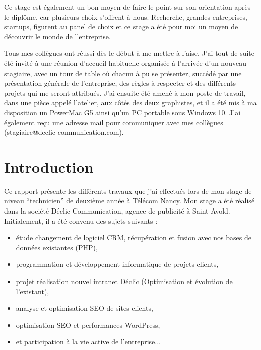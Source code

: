 \documentclass[report]{tnreport}
\begin{document}
Ce stage est également un bon moyen de faire le point sur son orientation après le diplôme, car plusieurs choix s’offrent à nous. Recherche, grandes entreprises, startups, figurent au panel de choix et ce stage a été pour moi un moyen de découvrir le monde de l’entreprise.

Tous mes collègues ont réussi dès le début à me mettre à l’aise. J'ai tout de suite été invité à une réunion d’accueil habituelle organisée à l’arrivée d’un nouveau stagiaire, avec un tour de table où chacun à pu se présenter, succédé par une présentation générale de l’entreprise, des règles à respecter et des différents projets qui me seront attribués. J’ai ensuite été amené à mon poste de travail, dans une pièce appelé l’atelier, aux côtés des deux graphistes, et il a été mis à ma disposition un PowerMac G5 ainsi qu’un PC portable sous Windows 10. J’ai également reçu une adresse mail pour communiquer avec mes collègues (stagiaire@declic-communication.com).





\cleardoublepage

\tableofcontents

\renewcommand{\baselinestretch}{1.0}\normalsize
\cleardoublepage

\setcounter{page}{1}

\chapter{Introduction}
Ce rapport présente les différents travaux que j’ai effectués lors de mon stage de niveau “technicien” de deuxième année à Télécom Nancy. Mon stage a été réalisé dans la société Déclic Communication, agence de publicité à Saint-Avold. Initialement, il a été convenu des sujets suivants :


\begin{itemize}
\item étude changement de logiciel CRM, récupération et fusion avec nos bases de données existantes (PHP),
\item programmation et développement informatique de projets clients,
\item projet réalisation nouvel intranet Déclic (Optimisation et évolution de l’existant),
\item analyse et optimisation SEO de sites clients,
\item optimisation SEO et performances WordPress,
\item et participation à la vie active de l’entreprise...
\end{itemize}
\end{document}
